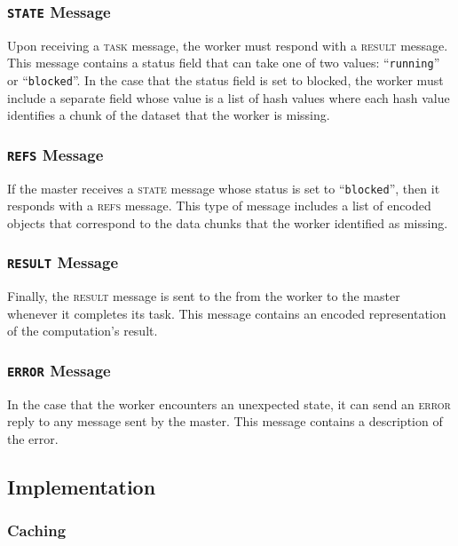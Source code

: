 \documentclass[%
  final,
  notitlepage,
  narroweqnarray,
  inline,
]{ieee}
\begin{document}
\subsubsection{\texttt{STATE} Message}

Upon receiving a \textsc{task} message, the worker must respond with a
\textsc{result} message. This message contains a status field that can take one
of two values: ``\texttt{running}'' or ``\texttt{blocked}''. In the case that
the status field is set to blocked, the worker must include a separate field
whose value is a list of hash values where each hash value identifies a chunk of
the dataset that the worker is missing.



\subsubsection{\texttt{REFS} Message}

If the master receives a \textsc{state} message whose status is set to
``\texttt{blocked}'', then it responds with a \textsc{refs} message. This type
of message includes a list of encoded objects that correspond to the data
chunks that the worker identified as missing.



\subsubsection{\texttt{RESULT} Message}

Finally, the \textsc{result} message is sent to the from the worker to the
master whenever it completes its task. This message contains an encoded
representation of the computation's result.


\subsubsection{\texttt{ERROR} Message}

In the case that the worker encounters an unexpected state, it can send an
\textsc{error} reply to any message sent by the master. This message contains
a description of the error.



\subsection{Implementation}
\label{Implementation}


\subsubsection{Caching}
\end{document}
